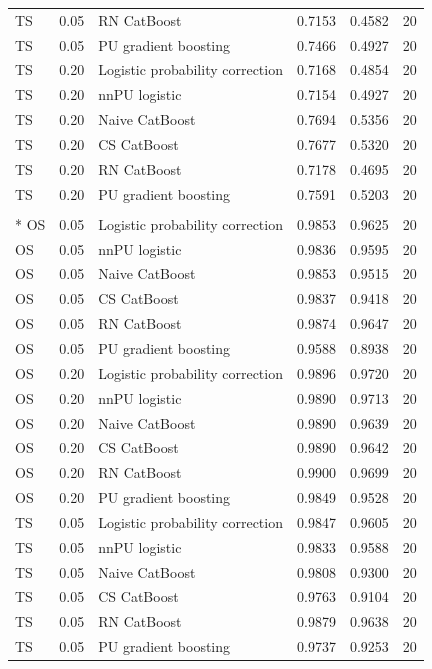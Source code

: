 \begin{longtable}{@{}p{0.65in}rp{2.85in}rrr@{}}
TS & 0.05 & RN CatBoost & 0.7153 & 0.4582 & 20 \\
TS & 0.05 & PU gradient boosting & 0.7466 & 0.4927 & 20 \\
\addlinespace[2pt]
TS & 0.20 & Logistic probability correction & 0.7168 & 0.4854 & 20 \\
TS & 0.20 & nnPU logistic & 0.7154 & 0.4927 & 20 \\
TS & 0.20 & Naive CatBoost & 0.7694 & 0.5356 & 20 \\
TS & 0.20 & CS CatBoost & 0.7677 & 0.5320 & 20 \\
TS & 0.20 & RN CatBoost & 0.7178 & 0.4695 & 20 \\
TS & 0.20 & PU gradient boosting & 0.7591 & 0.5203 & 20 \\
\addlinespace[2pt]
\multicolumn{6}{l}{\textbf{Dry Bean}}\\*
OS & 0.05 & Logistic probability correction & 0.9853 & 0.9625 & 20 \\
OS & 0.05 & nnPU logistic & 0.9836 & 0.9595 & 20 \\
OS & 0.05 & Naive CatBoost & 0.9853 & 0.9515 & 20 \\
OS & 0.05 & CS CatBoost & 0.9837 & 0.9418 & 20 \\
OS & 0.05 & RN CatBoost & 0.9874 & 0.9647 & 20 \\
OS & 0.05 & PU gradient boosting & 0.9588 & 0.8938 & 20 \\
\addlinespace[2pt]
OS & 0.20 & Logistic probability correction & 0.9896 & 0.9720 & 20 \\
OS & 0.20 & nnPU logistic & 0.9890 & 0.9713 & 20 \\
OS & 0.20 & Naive CatBoost & 0.9890 & 0.9639 & 20 \\
OS & 0.20 & CS CatBoost & 0.9890 & 0.9642 & 20 \\
OS & 0.20 & RN CatBoost & 0.9900 & 0.9699 & 20 \\
OS & 0.20 & PU gradient boosting & 0.9849 & 0.9528 & 20 \\
\addlinespace[2pt]
TS & 0.05 & Logistic probability correction & 0.9847 & 0.9605 & 20 \\
TS & 0.05 & nnPU logistic & 0.9833 & 0.9588 & 20 \\
TS & 0.05 & Naive CatBoost & 0.9808 & 0.9300 & 20 \\
TS & 0.05 & CS CatBoost & 0.9763 & 0.9104 & 20 \\
TS & 0.05 & RN CatBoost & 0.9879 & 0.9638 & 20 \\
TS & 0.05 & PU gradient boosting & 0.9737 & 0.9253 & 20 \\

\end{longtable}
